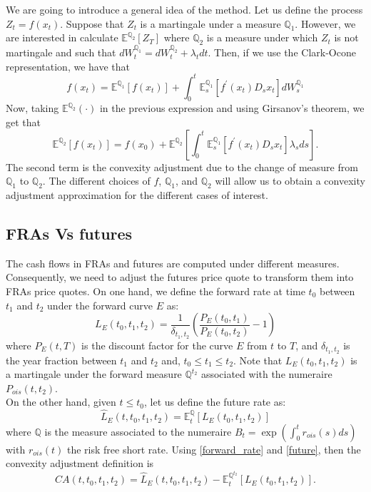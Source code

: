 \documentclass[a4paper,10pt]{article}
\newcommand{\1}{\mathbf{1}}
\begin{document}
We are going to introduce a general idea of the method. Let us define the process $Z_t = f(x_t)$. Suppose that $Z_t$ is a martingale under a measure $\mathbb{Q}_1$. However, we are interested in calculate $\mathbb{E}^{\mathbb{Q}_2}\left[Z_T \right]$ where $\mathbb{Q}_2$ is a measure under which $Z_t$ is not martingale and such that $dW^{\mathbb{Q}_1}_t = dW^{\mathbb{Q}_2}_t +\lambda_t dt$. Then, if we use the Clark-Ocone representation, we have that
\begin{equation*}
f(x_t) = \mathbb{E}^{\mathbb{Q}_1}\left[f(x_t)\right] + \int_{0}^{t} \mathbb{E}^{\mathbb{Q}_1}_s\left[ f^{\prime}(x_t) D_s x_t  \right] dW^{\mathbb{Q}_1}_s
\end{equation*}
Now, taking $\mathbb{E}^{\mathbb{Q}_2}\left( \cdot \right)$ in the previous expression and using Girsanov's theorem, we get that
\begin{equation}\label{general_convexity}
\mathbb{E}^{\mathbb{Q}_2}\left[ f(x_t) \right] = f(x_0) + \mathbb{E}^{\mathbb{Q}_2} \left[\int_{0}^{t}  \mathbb{E}^{\mathbb{Q}_1}_s\left[ f^{\prime}(x_t) D_s x_t  \right] \lambda_s ds \right]. 
\end{equation}
The second term is the convexity adjustment due to the change of measure from $\mathbb{Q}_1$ to $\mathbb{Q}_2$. The different choices of $f$, $\mathbb{Q}_1$, and $\mathbb{Q}_2$ will allow us to obtain a convexity adjustment approximation for the different cases of interest. 
\subsection{FRAs Vs futures}
The cash flows in FRAs and futures are computed under different measures. Consequently, we need to adjust the futures price quote to transform them into FRAs price quotes. On one hand, we define the forward rate at time $t_0$ between $t_1$ and $t_2$ under the forward curve $E$ as:
\begin{equation}\label{forward_rate}
L_{E}(t_0, t_1, t_2) = \frac{1}{\delta_{t_1,t_2}}\left(\frac{P_{E}(t_0,t_1)}{P_{E}(t_0,t_2)} - 1 \right)
\end{equation} 
where $P_{E}(t,T)$ is the discount factor for the curve $E$ from $t$ to $T$, and $\delta_{t_1,t_2}$ is the year fraction between $t_1$ and $t_2$ and, $t_{0}\leq t_{1} \leq t_{2}$. Note that $L_{E}(t_0, t_1, t_2)$ is a martingale under the forward measure $\mathbb{Q}^{t_2}$ associated with the numeraire $P_{ois}(t,t_2)$.\\

On the other hand, given $t\leq t_{0}$, let us define the future rate as:    
\begin{equation}\label{future}
\hat{L}_{E}(t,t_0, t_1, t_2) = \mathbb{E}_t^{\mathbb{Q}}\left[L_{E}(t_0, t_1, t_2) \right]
\end{equation}
where $\mathbb{Q}$ is the measure associated to the numeraire $B_t=\exp\left(\int_{0}^{t} r_{ois}(s) ds \right)$ with $ r_{ois}(t)$ the risk free short rate. Using
\eqref{forward_rate} and \eqref{future}, then the convexity adjustment definition is
\begin{equation*}
CA(t, t_0, t_1, t_2) = \hat{L}_{E}(t,t_0, t_1, t_2) - \mathbb{E}_t^{\mathbb{Q}^{t_2}}\left[L_{E}(t_0, t_1, t_2) \right].
\end{equation*}
\end{document}
